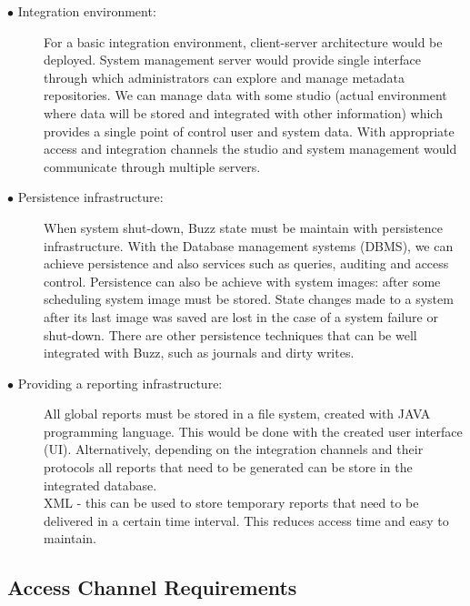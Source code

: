 \documentclass[hidelinks, 12pt]{article}
\begin{document}
\begin{description}
\item[$\bullet$ Integration environment:]

For a basic integration environment, client-server architecture would be deployed. System management server would provide single interface through which administrators can explore and manage metadata repositories. We can manage data with some studio (actual environment where data will be stored and integrated with other information) which provides a single point of control user and system data. With appropriate access and integration channels the studio and system management would communicate through multiple servers.\\

\item[$\bullet$ Persistence infrastructure:]

When system shut-down, Buzz state must be maintain with persistence infrastructure. With the Database management systems (DBMS), we can achieve persistence and also services such as queries, auditing and access control. Persistence can also be achieve with system images: after some scheduling system image must be stored. State changes made to a system after its last image was saved are lost in the case of a system failure or shut-down. There are other persistence techniques that can be well integrated with Buzz, such as journals and dirty writes.\\

\item[$\bullet$ Providing a reporting infrastructure:]

All global reports must be stored in a file system, created with JAVA programming language. This would be done with the created user interface (UI). Alternatively, depending on the integration channels and their protocols all reports that need to be generated can be store in the integrated database.\\

XML - this can be used to store temporary reports that need to be delivered in a certain time interval. This reduces access time and easy to maintain.\\

\end{description}


\pagebreak 
\subsection{Access Channel Requirements}
\end{document}

